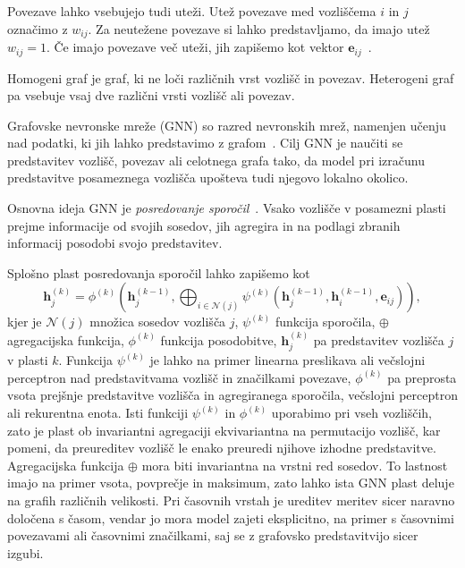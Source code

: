 Povezave lahko vsebujejo tudi uteži.
Utež povezave med vozliščema $i$ in $j$ označimo z $w_{ij}$.
Za neutežene povezave si lahko predstavljamo, da imajo utež $w_{ij}=1$.
Če imajo povezave več uteži, jih zapišemo kot vektor $\mathbf{e}_{ij}$~\cite{gilmer2017mpnn}.

Homogeni graf je graf, ki ne loči različnih vrst vozlišč in povezav.
Heterogeni graf pa vsebuje vsaj dve različni vrsti vozlišč ali povezav.

Grafovske nevronske mreže (GNN) so razred nevronskih mrež, namenjen učenju nad podatki, ki jih lahko predstavimo z grafom~\cite{gilmer2017mpnn,kipf2017gcn}.
Cilj GNN je naučiti se predstavitev vozlišč, povezav ali celotnega grafa tako, da model pri izračunu predstavitve posameznega vozlišča upošteva tudi njegovo lokalno okolico.

Osnovna ideja GNN je \emph{posredovanje sporočil}~\cite{gilmer2017mpnn}.
Vsako vozlišče v posamezni plasti prejme informacije od svojih sosedov, jih agregira in na podlagi zbranih informacij posodobi svojo predstavitev.

Splošno plast posredovanja sporočil lahko zapišemo kot
\begin{equation}
    \mathbf{h}_j^{(k)} =
    \phi^{(k)}
    \left(
        \mathbf{h}_j^{(k-1)},
        \bigoplus_{i \in \mathcal{N}(j)}
        \psi^{(k)}
        \left(
            \mathbf{h}_j^{(k-1)},
            \mathbf{h}_i^{(k-1)},
            \mathbf{e}_{ij}
        \right)
    \right),
    \label{eq:splosno-posredovanje-sporocil}
\end{equation}
kjer je $\mathcal{N}(j)$ množica sosedov vozlišča $j$, $\psi^{(k)}$ funkcija sporočila, $\oplus$ agregacijska funkcija, $\phi^{(k)}$ funkcija posodobitve, $\mathbf{h}_j^{(k)}$ pa predstavitev vozlišča $j$ v plasti $k$.
Funkcija $\psi^{(k)}$ je lahko na primer linearna preslikava ali večslojni perceptron nad predstavitvama vozlišč in značilkami povezave, $\phi^{(k)}$ pa preprosta vsota prejšnje predstavitve vozlišča in agregiranega sporočila, večslojni perceptron ali rekurentna enota.
Isti funkciji $\psi^{(k)}$ in $\phi^{(k)}$ uporabimo pri vseh vozliščih, zato je plast ob invariantni agregaciji ekvivariantna na permutacijo vozlišč, kar pomeni, da preureditev vozlišč le enako preuredi njihove izhodne predstavitve.
Agregacijska funkcija $\oplus$ mora biti invariantna na vrstni red sosedov.
To lastnost imajo na primer vsota, povprečje in maksimum, zato lahko ista GNN plast deluje na grafih različnih velikosti.
Pri časovnih vrstah je ureditev meritev sicer naravno določena s časom, vendar jo mora model zajeti eksplicitno, na primer s časovnimi povezavami ali časovnimi značilkami, saj se z grafovsko predstavitvijo sicer izgubi.

